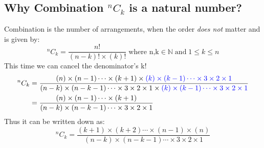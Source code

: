 \documentclass[12pt, twoside]{article}
\newcommand*{\Combination}[2]{{}^{#1}C_{#2}}%
\begin{document}
 	\subsection{Why Combination $\Combination{n}{k}$ is a natural number?}
 	Combination is the number of arrangements, when the order \textit{does not} matter and is given by:\newline
 	\begin{equation}
 		\Combination{n}{k} = \frac{n!}{(n-k)!\times(k)!} \; \text{where n,k} \in \mathbb{N} \; \text{and} \; 1 \leq k \leq n
 	\end{equation}
 	This time we can cancel the denominator's k!
 	\begin{align*}
 		\Combination{n}{k} &= \frac{(n)\times(n-1)\cdots\times(k+1)\times\color{blue}(k)\times(k-1)\cdots\times3\times2\times1}{(n-k)\times(n-k-1)\cdots\times3\times2\times1\times\color{blue}(k)\times(k-1)\cdots\times3\times2\times1}\\
 		&= \frac{(n)\times(n-1)\cdots\times(k+1)}{(n-k)\times(n-k-1)\cdots\times3\times2\times1}
 	\end{align*}
 Thus it can be written down as:
 \begin{equation}
 	\Combination{n}{k} = \frac{(k+1)\times(k+2)\cdots\times(n-1)\times(n)}{(n-k)\times(n-k-1)\cdots\times3\times2\times1} \label{reducedCombinationForm}
 \end{equation}
\end{document}
